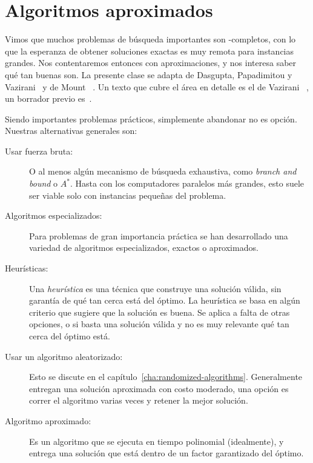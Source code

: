 

\chapter{Algoritmos aproximados}
\label{cha:algoritmos-aproximados}

  Vimos que muchos problemas de búsqueda importantes
  son \NP\nobreakdash-completos,
  con lo que la esperanza de obtener soluciones exactas es muy remota
  para instancias grandes.
  Nos contentaremos entonces con aproximaciones,
  y nos interesa saber qué tan buenas son.
  La presente clase se adapta de Dasgupta, Papadimitou y Vazirani~%
    \cite{dasgupta06:_algorithms}
  y de Mount~%
    \cite{mount03:_cmsc451}.
  Un texto que cubre el área en detalle es el de Vazirani~%
    \cite{vazirani03:_approx_algor},
  un borrador previo es~\cite{vazirani03:_approx_algor}.

  Siendo importantes problemas prácticos,
  simplemente abandonar no es opción.
  Nuestras alternativas generales son:
  \begin{description}
  \item[Usar fuerza bruta:]
    O al menos algún mecanismo de búsqueda exhaustiva,
    como \emph{\foreignlanguage{english}{branch and bound}} o \(A^*\).
    Hasta con los computadores paralelos más grandes,
    esto suele ser viable solo con instancias pequeñas del problema.
  \item[Algoritmos especializados:]
    Para problemas de gran importancia práctica
    se han desarrollado una variedad de algoritmos especializados,
    exactos o aproximados.
  \item[Heurísticas:]
    Una \emph{heurística} es una técnica que construye una solución válida,
    sin garantía de qué tan cerca está del óptimo.
    La heurística se basa en algún criterio
    que sugiere que la solución es buena.
    Se aplica a falta de otras opciones,
    o si basta una solución válida
    y no es muy relevante qué tan cerca del óptimo está.
  \item[Usar un algoritmo aleatorizado:]
    Esto se discute en el capítulo~\ref{cha:randomized-algorithms}.
    Generalmente entregan una solución aproximada con costo moderado,
    una opción es correr el algoritmo varias veces
    y retener la mejor solución.
  \item[Algoritmo aproximado:]
    Es un algoritmo que se ejecuta en tiempo polinomial
    (idealmente),
    y entrega una solución
    que está dentro de un factor garantizado del óptimo.
  \end{description}

